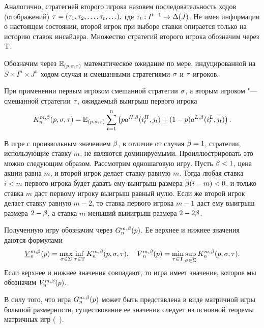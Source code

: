 {Аналогично, стратегией второго игрока назовем последовательность ходов (отображений) 
$\tau = (\tau_{1}, \tau_{2}, \ldots, \tau_{t}, \ldots),$ где 
$\tau_{t}: I^{t-1} \rightarrow \Delta(J)$.
Не имея информации о настоящем состоянии, второй игрок при выборе ставки опирается только на историю ставок инсайдера.
Множество стратегий второго игрока обозначим через $\mathrm{T}$.

Обозначим через $\operatorname{\mathbb{E}}_{(p,\sigma,\tau)}$ математическое ожидание по мере, индуцированной на $S \times I^n \times J^n$ ходом случая и смешанными стратегиями $\sigma$ и $\tau$ игроков.

При применении первым игроком смешанной стратегии $\sigma$, а вторым игроком "--- смешанной стратегии $\tau$, ожидаемый выигрыш первого игрока
\begin{equation}
  \label{ch1:eq:firstPlayerPayoff}
  \K*{n}(p, \sigmar, \taur) = \E_{(p,\sigmar,\taur)} \sum_{t=1}^n
  \left(
    p \as[H](i_t^H, j_t) + (1 - p)\as[L](i_t^L, j_t)
  \right).
\end{equation}

\begin{remark}
  В игре с произвольным значением $\beta$, в отличие от случая $\beta = 1$, стратегии, использующие ставку $m$, не являются доминируемыми.
  Проиллюстрировать это можно следующим образом.
  Рассмотрим одношаговую игру.
  Пусть $\beta < 1$, цена акции равна $m$, и второй игрок делает ставку равную $m$.
  Тогда любая ставка $i < m$ первого игрока будет давать ему выигрыш размера ${{\overline{\beta}}} (i - m) < 0$, и только ставка $m$ даст первому игроку выигрыш равный нулю. 
  Если же второй игрок делает ставку равную $m-2$, то ставка первого игрока $m-1$ даст ему выигрыш размера $2-\beta$, а ставка $m$ меньший выиигрыш размера $2-2\beta$.
\end{remark}

Полученную игру обозначим через $\theG*{n}(p)$.
Ее верхнее и нижнее значения даются формулами
\begin{equation*}
  \LowV*{n}(p) = \max_{\sigmar \in \Sigma} \inf_{\taur \in \Tau}
  \K*{n}(p, \sigmar, \taur), \quad
  \HighV*{n}(p) = \min_{\taur \in \Tau} \sup_{\sigmar \in \Sigma}
  \K*{n}(p, \sigmar, \taur).
\end{equation*}
Если верхнее и нижнее значения совпадают, то игра имеет значение, которое мы обозначим $\V*{n}(p)$.

\begin{remark}
  В силу того, что игра $\theG*{n}(p)$ может быть представлена в виде матричной игры большой размерности, существование ее значения следует из основной теоремы матричных игр (\seename~\cite{morozov08}).
\end{remark}

}
